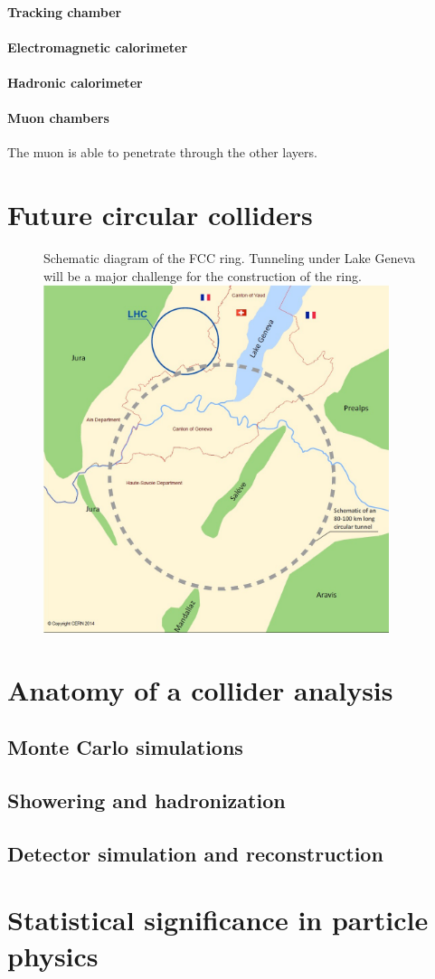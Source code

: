\paragraph{Tracking chamber}
\paragraph{Electromagnetic calorimeter}
\paragraph{Hadronic calorimeter}
\paragraph{Muon chambers} The muon is able to penetrate through the other layers.

\section{Future circular colliders}

\begin{figure}[h]
  \begin{sidecaption}
    {Schematic diagram of the FCC ring. Tunneling under Lake Geneva will be a major challenge for the construction of the ring.}
    \centering
  \includegraphics[width=0.9\textwidth]{images/FCC_ring_schematic}
  \end{sidecaption}
\end{figure}
\section{Anatomy of a collider analysis}
\subsection{Monte Carlo simulations}
\subsection{Showering and hadronization}
\subsection{Detector simulation and reconstruction}
\section{Statistical significance in particle physics}
